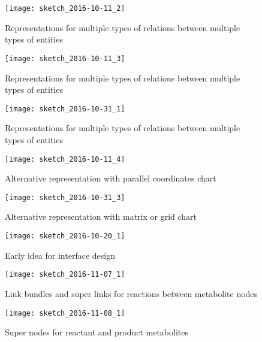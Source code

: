 

\begin{figure}[t]
\texttt{[image: sketch\_2016-10-11\_2]}
\centering
\caption{Representations for multiple types of relations between multiple types of entities}
\label{fig:2016-10-11_2}
\end{figure}

\begin{figure}[t]
\texttt{[image: sketch\_2016-10-11\_3]}
\centering
\caption{Representations for multiple types of relations between multiple types of entities}
\label{fig:2016-10-11_3}
\end{figure}

\begin{figure}[t]
\texttt{[image: sketch\_2016-10-31\_1]}
\centering
\caption{Representations for multiple types of relations between multiple types of entities}
\label{fig:2016-10-31_1}
\end{figure}

\begin{figure}[t]
\texttt{[image: sketch\_2016-10-11\_4]}
\centering
\caption{Alternative representation with parallel coordinates chart}
\label{fig:2016-10-11_4}
\end{figure}

\begin{figure}[t]
\texttt{[image: sketch\_2016-10-31\_3]}
\centering
\caption{Alternative representation with matrix or grid chart}
\label{fig:2016-10-31_3}
\end{figure}

\begin{figure}[t]
\texttt{[image: sketch\_2016-10-20\_1]}
\centering
\caption{Early idea for interface design}
\label{fig:2016-10-20_1}
\end{figure}

\begin{figure}[t]
\texttt{[image: sketch\_2016-11-07\_1]}
\centering
\caption{Link bundles and super links for reactions between metabolite nodes}
\label{fig:2016-11-07_1}
\end{figure}

\begin{figure}[t]
\texttt{[image: sketch\_2016-11-08\_1]}
\centering
\caption{Super nodes for reactant and product metabolites}
\label{fig:2016-11-08_1}
\end{figure}

